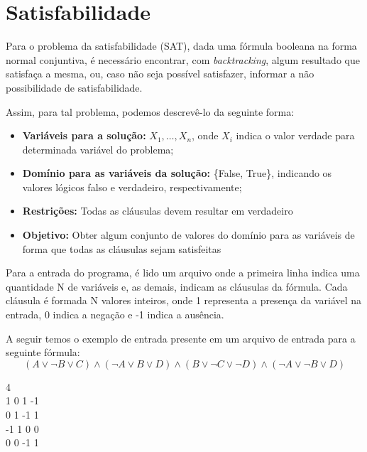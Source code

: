 \documentclass[12pt]{article}
\begin{document}
    

\clearpage
\section{Satisfabilidade}
    Para o problema da satisfabilidade (SAT), dada uma fórmula booleana na forma normal conjuntiva, é necessário encontrar, com \textit{backtracking}, algum resultado que satisfaça a mesma, ou, caso não seja possível satisfazer, informar a não possibilidade de satisfabilidade.

    Assim, para tal problema, podemos descrevê-lo da seguinte forma:
    \begin{itemize}
        \item \textbf{Variáveis para a solução:} \(X_1, \dots, X_n\), onde \(X_i\) indica o valor verdade para determinada variável do problema;
        \item \textbf{Domínio para as variáveis da solução:} \{False, True\}, indicando os valores lógicos falso e verdadeiro, respectivamente;
        \item \textbf{Restrições:} Todas as cláusulas devem resultar em verdadeiro
        \item \textbf{Objetivo:} Obter algum conjunto de valores do domínio para as variáveis de forma que todas as cláusulas sejam satisfeitas
    \end{itemize}

    \par Para a entrada do programa, é lido um arquivo onde a primeira linha indica uma quantidade N de variáveis e, as demais, indicam as cláusulas da fórmula. Cada cláusula é formada N valores inteiros, onde 1 representa a presença da variável na entrada, 0 indica a negação e -1 indica a ausência.

    \par A seguir temos o exemplo de entrada presente em um arquivo de entrada para a seguinte fórmula: \[(A \lor \neg B \lor C) \land (\neg A \lor B \lor D) \land (B \lor \neg C \lor \neg D) \land (\neg A \lor \neg B \lor D)\]

    \begin{tcolorbox}[title=Arquivo de entrada para a fórmula, width=\linewidth, 
      fontupper=\ttfamily, 
      halign=flush left]
        4 \\
        1 0 1 -1 \\
        0 1 -1 1 \\
        -1 1 0 0 \\
        0 0 -1 1
    \end{tcolorbox}
    
\end{document}
